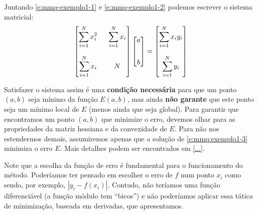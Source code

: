 \documentclass[12pt]{report}
\begin{document}
	Juntando \eqref{e:mmq-exemplo1-1} e \eqref{e:mmq-exemplo1-2} podemos escrever o sistema matricial:
	\begin{equation}
		\setlength\arraycolsep{8pt}
		\begin{bmatrix}
			\ds \sum_{i=1}^{N} x_i^2 	& \ds \sum_{i=1}^{N} x_i \\[20pt]
			\ds \sum_{i=1}^{N} x_i 		& \ds N %
		\end{bmatrix}
		\begin{bmatrix}
			a \\[20pt] b
		\end{bmatrix}
		=
		\begin{bmatrix}
			\ds \sum_{i=1}^{N} x_i y_i \\[20pt]
			\ds \sum_{i=1}^{N} y_i
		\end{bmatrix}
		\label{e:mmq:exemplo1-3}
	\end{equation}
	
	Satisfazer o sistema assim é uma \textbf{condição necessária} para que um ponto $(a, b)$ seja mínimo da função $E(a, b)$, mas ainda \textbf{não garante} que este ponto seja um mínimo local de $E$ (menos ainda que seja global). Para garantir que encontramos um ponto $(a, b)$ que minimize o erro, devemos olhar para as propriedades da matriz hessiana e da convexidade de $E$. Para não nos estendermos demais, assumiremos apenas que a solução de \eqref{e:mmq:exemplo1-3} minimiza o erro $E$. Mais detalhes podem ser encontrados em \ref{...}.
	
	Note que a escolha da função de erro é fundamental para o funcionamento do método. Poderíamos ter pensado em escolher o erro de $f$ num ponto $x_i$ como sendo, por exemplo, $|y_i-f(x_i)|$. Contudo, não teríamos uma função diferenciável (a função módulo tem ``bicos'') e não poderíamos aplicar essa tática de minimização, baseada em derivadas, que apresentamos.
\end{document}
